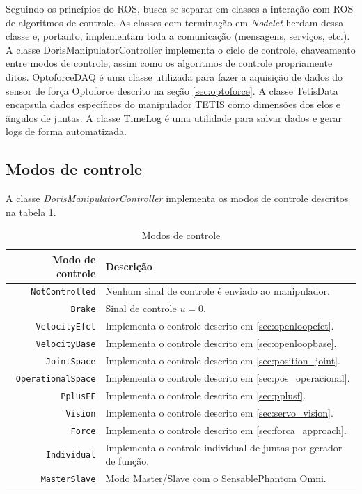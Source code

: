 Seguindo os princípios do ROS, busca-se separar em classes a interação com ROS de algoritmos de controle. As classes com terminação em \textit{Nodelet} herdam dessa classe e, portanto, implementam toda a comunicação (mensagens, serviços, etc.). A classe DorisManipulatorController implementa o ciclo de controle, chaveamento entre modos de controle, assim como os algoritmos de controle propriamente ditos. OptoforceDAQ é uma classe utilizada para fazer a aquisição de dados do sensor de força Optoforce descrito na seção \ref{sec:optoforce}. A classe TetisData encapsula dados específicos do manipulador TETIS como dimensões dos elos e ângulos de juntas. A classe TimeLog é uma utilidade para salvar dados e gerar logs de forma automatizada. 

\subsection{Modos de controle} \label{sec:ctrlmodes}

A classe \textit{DorisManipulatorController} implementa os modos de controle descritos na tabela \ref{tab:control_modes}. 


\begin{table}[h!]
\centering
\caption{Modos de controle}
\label{tab:control_modes}
\begin{tabular}{rl} \hline
Modo de controle      	& Descrição \\ \hline
\verb|NotControlled|  	& Nenhum sinal de controle é enviado ao manipulador.\\
\verb|Brake|			& Sinal de controle $u = 0$. \\
\verb|VelocityEfct|		& Implementa o controle descrito em \ref{sec:openloopefct}. \\
\verb|VelocityBase|		& Implementa o controle descrito em \ref{sec:openloopbase}. \\
\verb|JointSpace|		& Implementa o controle descrito em \ref{sec:position_joint}. \\
\verb|OperationalSpace| & Implementa o controle descrito em \ref{sec:pos_operacional}. \\
\verb|PplusFF|			& Implementa o controle descrito em \ref{sec:pplusf}. \\
\verb|Vision|			& Implementa o controle descrito em \ref{sec:servo_vision}. \\
\verb|Force|			& Implementa o controle descrito em \ref{sec:forca_approach}. \\
\verb|Individual|		& Implementa o controle individual de juntas por gerador de função. \\
\verb|MasterSlave|		& Modo Master/Slave com o Sensable\circledR Phantom Omni. \\
\hline
\end{tabular}
\end{table}

